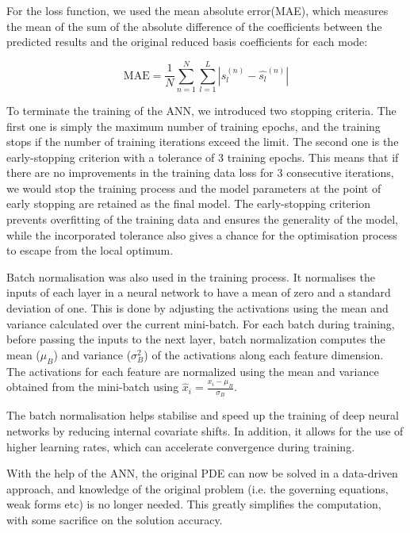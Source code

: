 For the loss function, we used the mean absolute error(MAE), which measures the mean of the sum of the absolute difference of the coefficients between the predicted results and the original reduced basis coefficients for each mode:

\begin{equation}
    \text{MAE} = \frac{1}{N} \sum_{n=1}^{N} \sum_{l=1}^{L} | s_l^{(n)} - \hat{s_l}^{(n)}|
\end{equation}

To terminate the training of the ANN, we introduced two stopping criteria. The first one is simply the maximum number of training epochs, and the training stops if the number of training iterations exceed the limit. The second one is the early-stopping criterion with a tolerance of 3 training epochs. This means that if there are no improvements in the training data loss for 3 consecutive iterations, we would stop the training process and the model parameters at the point of early stopping are retained as the final model. The early-stopping criterion prevents overfitting of the training data and ensures the generality of the model, while the incorporated tolerance also gives a chance for the optimisation process to escape from the local optimum.   

Batch normalisation was also used in the training process. It normalises the inputs of each layer in a neural network to have a mean of zero and a standard deviation of one. This is done by adjusting the activations using the mean and variance calculated over the current mini-batch. For each batch during training, before passing the inputs to the next layer, batch normalization computes the mean ($\mu_B$) and variance ($\sigma^2_B$) of the activations along each feature dimension. The activations for each feature are normalized using the mean and variance obtained from the mini-batch using $\hat{x}_i = \frac{x_i - \mu_B}{\sigma_B}$.

The batch normalisation helps stabilise and speed up the training of deep neural networks by reducing internal covariate shifts. In addition, it allows for the use of higher learning rates, which can accelerate convergence during training.

With the help of the ANN, the original PDE can now be solved in a data-driven approach, and knowledge of the original problem (i.e. the governing equations, weak forms etc) is no longer needed. This greatly simplifies the computation, with some sacrifice on the solution accuracy. 


